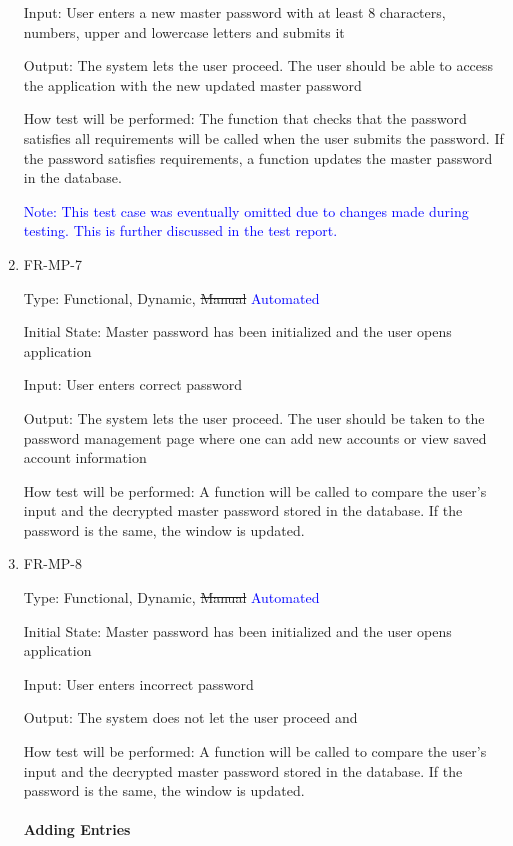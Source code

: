\documentclass[12pt, titlepage]{article}
\begin{document}
\begin{enumerate}
Input: User enters a new master password with at least 8 characters, numbers, upper and lowercase letters and submits it

Output: The system lets the user proceed. The user should be able to access the application with the new updated master password

How test will be performed: The function that checks that the password satisfies all requirements will be called when the user submits the password. If the password satisfies requirements, a function updates the master password in the database.

\textcolor{blue}{Note: This test case was eventually omitted due to changes made during testing. This is further discussed in the test report.}

\item{FR-MP-7\\}

Type: Functional, Dynamic, \sout{Manual} \textcolor{blue}{Automated}

Initial State: Master password has been initialized and the user opens application

Input: User enters correct password

Output: The system lets the user proceed. The user should be taken to the password management page where one can add new accounts or view saved account information

How test will be performed: A function will be called to compare the user’s input and the decrypted master password stored in the database. If the password is the same, the window is updated.

\item{FR-MP-8\\}

Type: Functional, Dynamic, \sout{Manual} \textcolor{blue}{Automated}

Initial State: Master password has been initialized and the user opens application

Input: User enters incorrect password

Output: The system does not let the user proceed and 

How test will be performed: A function will be called to compare the user’s input and the decrypted master password stored in the database. If the password is the same, the window is updated.

\paragraph{Adding Entries}


\end{enumerate}
\end{document}
